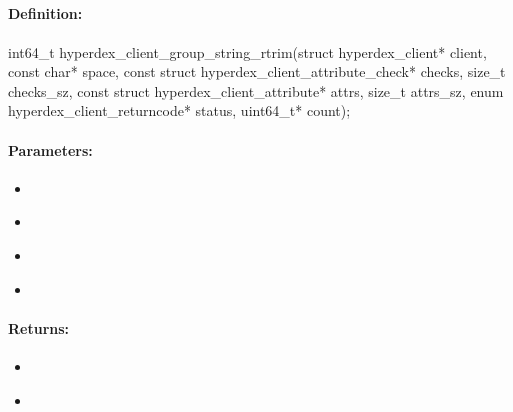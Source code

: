 \pagebreak
\subsection{}
\label{api:c:group_string_rtrim}


\paragraph{Definition:}
\begin{ccode}
int64_t hyperdex_client_group_string_rtrim(struct hyperdex_client* client,
        const char* space,
        const struct hyperdex_client_attribute_check* checks, size_t checks_sz,
        const struct hyperdex_client_attribute* attrs, size_t attrs_sz,
        enum hyperdex_client_returncode* status,
        uint64_t* count);
\end{ccode}

\paragraph{Parameters:}
\begin{itemize}[noitemsep]
\item {}\\

\item {}\\

\item {}\\

\item {}\\

\end{itemize}

\paragraph{Returns:}
\begin{itemize}[noitemsep]
\item {}\\

\item {}\\

\end{itemize}

